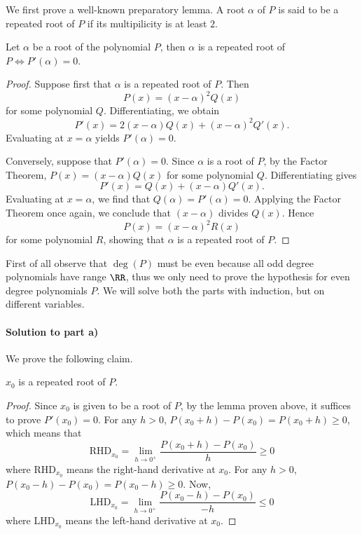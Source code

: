 \documentclass[numbers=endperiod, 11pt]{scrartcl}
\begin{document}
\begin{sol}
    We first prove a well-known preparatory lemma.
    A root $\alpha$ of $P$ is said to be a repeated root
    of $P$ if its multipilicity is at least $2$.

    \begin{lemma*}
        Let $\alpha$ be a root of the polynomial $P$,
        then $\alpha$ is a repeated root of
        $P \iff P'(\alpha) = 0$.
    \end{lemma*}
    \begin{proof}
        Suppose first that $\alpha$ is a repeated root of
        $P$. Then
        \[ P(x)=(x-\alpha)^2Q(x) \]
        for some polynomial $Q$. Differentiating, we
        obtain
        \[ P'(x)=2(x-\alpha)Q(x)+(x-\alpha)^2Q'(x).\]
        Evaluating at $x=\alpha$ yields $P'(\alpha)=0$.

        Conversely, suppose that $P'(\alpha)=0$. Since
        $\alpha$ is a root of $P$, by the Factor Theorem,
        $P(x)=(x-\alpha)Q(x)$ for some polynomial $Q$.
        Differentiating gives
        \[
            P'(x)=Q(x)+(x-\alpha)Q'(x).
        \]
        Evaluating at $x=\alpha$, we find that
        $Q(\alpha)=P'(\alpha)=0$.
        Applying the Factor Theorem once again, we conclude that
        $(x-\alpha)$ divides $Q(x)$. Hence
        \[
            P(x)=(x-\alpha)^2R(x)
        \]
        for some polynomial $R$, showing that $\alpha$ is a repeated root
        of $P$.
    \end{proof}

    First of all observe that $\deg(P)$ must be even
    because all odd degree polynomials have range $\RR$,
    thus we only need to prove the hypothesis for
    even degree polynomials $P$. We will solve
    both the parts with induction, but on different
    variables.

    \paragraph{Solution to part a)} We prove the
    following claim.

    \begin{claim*}
        $x_0$ is a repeated root of $P$.
    \end{claim*}
    \begin{proof}
        Since $x_0$ is given to be a root of $P$, by the
        lemma proven above, it suffices to prove
        $P'(x_0) = 0$. For any $h > 0$,
        $P(x_0 + h) - P(x_0) = P(x_0 + h) \ge 0$, which
        means that
        \[\text{RHD}_{x_0} = \lim_{h \to 0^+} \frac{P(x_0+h) - P(x_0)}{h} \ge 0 \]
        where RHD$_{x_0}$ means the right-hand derivative
        at $x_0$. For any $h > 0$,
        $P(x_0 - h) - P(x_0) = P(x_0 - h) \ge 0$. Now,
        \[\text{LHD}_{x_0} = \lim_{h \to 0^+} \frac{P(x_0-h) - P(x_0)}{-h} \le 0 \]
        where LHD$_{x_0}$ means the left-hand derivative
        at $x_0$.


\end{proof}
\end{sol}
\end{document}
